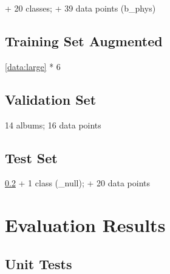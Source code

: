 \begin{uomappendix}
                + 20 classes; + 39 data points (b_phys)
    
            \subsection{Training Set Augmented} \label{data:aug}
    
                \ref{data:large} * 6
    
            \subsection{Validation Set} \label{data:val}
    
                14 albums; 16 data points
    
            \subsection{Test Set} \label{data:test}
    
                \ref{data:val} + 1 class (\_null); + 20 data points
    
        \section{Evaluation Results}
    
            \subsection{Unit Tests}

\end{uomappendix}
